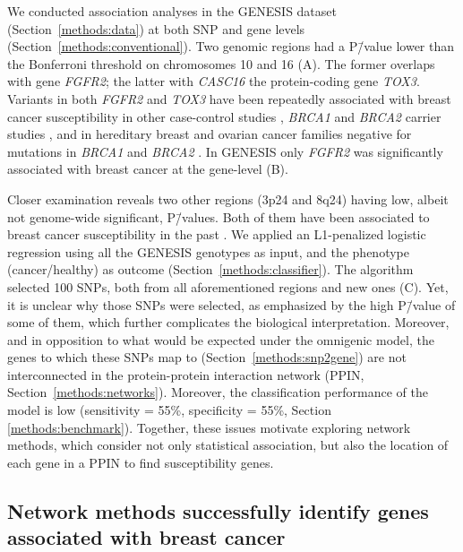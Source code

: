 \documentclass[10pt,letterpaper]{article}
\begin{document}
We conducted association analyses in the GENESIS dataset (Section~\ref{methods:data}) at both SNP and gene levels (Section~\ref{methods:conventional}). Two genomic regions had a P\=/value lower than the Bonferroni threshold on chromosomes 10 and 16 (A). The former overlaps with gene \emph{FGFR2}; the latter with \emph{CASC16} the protein-coding gene \emph{TOX3}. Variants in both \emph{FGFR2} and \emph{TOX3} have been repeatedly associated with breast cancer susceptibility in other case-control studies \cite{Michailidou2017}, \emph{BRCA1} and \emph{BRCA2} carrier studies \cite{Mulligan2011}, and in hereditary breast and ovarian cancer families negative for mutations in \emph{BRCA1} and \emph{BRCA2} \cite{rinella_genetic_2013}. In GENESIS only \emph{FGFR2} was significantly associated with breast cancer at the gene-level (B).

Closer examination reveals two other regions (3p24 and 8q24) having low, albeit not genome-wide significant, P\=/values. Both of them have been associated to breast cancer susceptibility in the past \cite{brisbin_meta-analysis_2011,search_newly_2009}. We applied an L1-penalized logistic regression using all the GENESIS genotypes as input, and the phenotype (cancer/healthy) as outcome (Section~\ref{methods:classifier}). The algorithm selected 100 SNPs, both from all aforementioned regions and new ones (C). Yet, it is unclear why those SNPs were selected, as emphasized by the high P\=/value of some of them, which further complicates the biological interpretation. Moreover, and in opposition to what would be expected under the omnigenic model, the genes to which these SNPs map to (Section~\ref{methods:snp2gene}) are not interconnected in the protein-protein interaction network (PPIN, Section~\ref{methods:networks}). Moreover, the classification performance of the model is low (sensitivity = 55\%, specificity = 55\%, Section \ref{methods:benchmark}). Together, these issues motivate exploring network methods, which consider not only statistical association, but also the location of each gene in a PPIN to find susceptibility genes.

\subsection{Network methods successfully identify genes associated with breast cancer}
\label{results:separate_networks}
\end{document}
